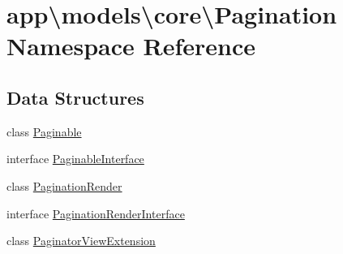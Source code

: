 \hypertarget{namespaceapp_1_1models_1_1core_1_1_pagination}{\section{app\textbackslash{}models\textbackslash{}core\textbackslash{}Pagination Namespace Reference}
\label{namespaceapp_1_1models_1_1core_1_1_pagination}
}
\subsection*{Data Structures}
\begin{DoxyCompactItemize}
\item 
class \hyperlink{classapp_1_1models_1_1core_1_1_pagination_1_1_paginable}{Paginable}
\item 
interface \hyperlink{interfaceapp_1_1models_1_1core_1_1_pagination_1_1_paginable_interface}{Paginable\-Interface}
\item 
class \hyperlink{classapp_1_1models_1_1core_1_1_pagination_1_1_pagination_render}{Pagination\-Render}
\item 
interface \hyperlink{interfaceapp_1_1models_1_1core_1_1_pagination_1_1_pagination_render_interface}{Pagination\-Render\-Interface}
\item 
class \hyperlink{classapp_1_1models_1_1core_1_1_pagination_1_1_paginator_view_extension}{Paginator\-View\-Extension}
\end{DoxyCompactItemize}
